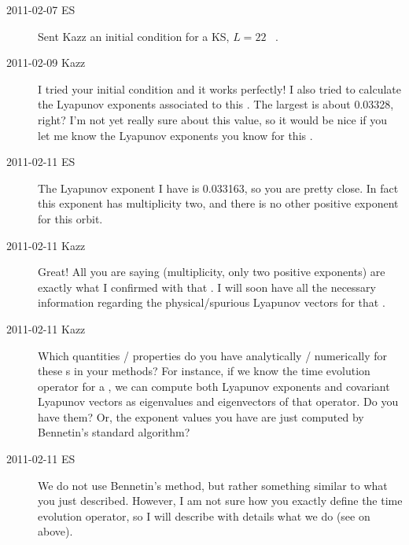 \begin{description}
\item[2011-02-07 ES] Sent Kazz an initial condition for a KS, $L=22$ \po\
.


\item[2011-02-09 Kazz] I tried your initial condition and it works perfectly!
I also tried to calculate the Lyapunov exponents associated to this {\po}.
The largest is about 0.03328, right? I'm not yet really sure about this value,
so it would be nice if you let me know the Lyapunov exponents you know for this {\po}.

\item[2011-02-11 ES] The Lyapunov exponent I have is 0.033163, so you
are pretty close. In fact this exponent has multiplicity two, and
there is no other positive exponent for this orbit.

\item[2011-02-11 Kazz] Great! All you are saying (multiplicity, only two positive
exponents) are exactly what I confirmed with that {\po}. I will soon have all
the necessary information regarding the physical/spurious Lyapunov vectors for that {\po}.

\item[2011-02-11 Kazz] Which quantities / properties do you have
analytically / numerically for these \po s in your methods? For instance,
if we know the time evolution operator for a {\po}, we can compute both
Lyapunov exponents and covariant Lyapunov vectors as eigenvalues and
eigenvectors of that operator. Do you have them? Or, the exponent values
you have are just computed by Bennetin's standard algorithm?

\renewcommand{\ssp}{x}

\item[2011-02-11 ES] We do not use Bennetin's method, but rather
something similar to what you just described. However, I am not sure how
you exactly define the time evolution operator, so I will describe with
details what we do (see \refrem{rem:Lyapunov} on \refpage{rem:Lyapunov} above).


\end{description}
